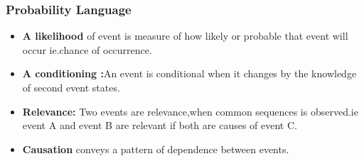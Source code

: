 \documentclass{beamer}
\begin{document}
\begin{frame}
\frametitle{\textbf{Probability Language}}
\begin{itemize}
\item \textbf{A likelihood} of event  is measure of  how likely or probable that  event will occur ie.chance of occurrence.
\item \textbf{A conditioning :}An event is conditional when it changes by the knowledge of second event states.
\item \textbf{Relevance:}  Two events are relevance,when common sequences is observed.ie event A and event B are relevant if both are causes of event C.
\item \textbf{Causation} conveys a pattern of dependence between events.
\end{itemize}
\end{frame}
\end{document}
